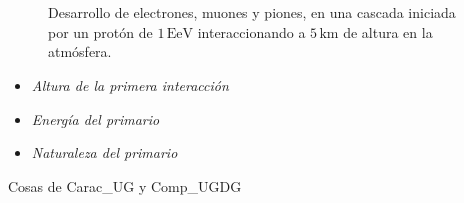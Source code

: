 \documentclass[12 pt, a4paper]{article} %
\numberwithin{equation}{section}
\numberwithin{figure}{section}
\numberwithin{table}{section}
\begin{document}
\begin{figure}[H]
	\centering
	\\
	\\
	\caption{Desarrollo de electrones, muones y piones, en una cascada iniciada por un protón de $1\,\mathrm{EeV}$ interaccionando a $5\,\mathrm{km}$ de altura en la atmósfera.}
	\label{Carac_UG_vardeg}
\end{figure}

\begin{itemize}
	\item \textit{Altura de la primera interacción}
\end{itemize}
\begin{itemize}
	\item \textit{Energía del primario}
\end{itemize}
\begin{itemize}
	\item \textit{Naturaleza del primario}
\end{itemize}
	Cosas de Carac\_UG y Comp\_UGDG
	\clearpage %
\end{document}
